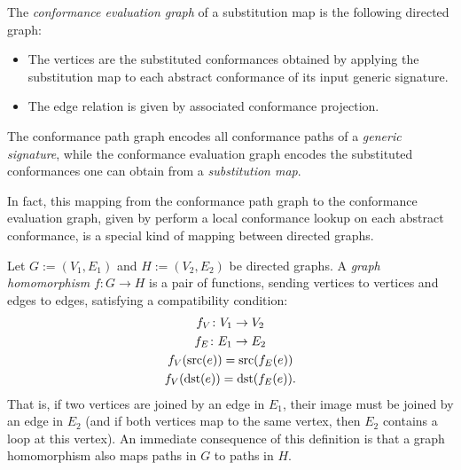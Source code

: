 \documentclass[../generics]{subfiles}
\begin{document}
\begin{definition}
The \emph{conformance evaluation graph} of a substitution map is the following directed graph:
\begin{itemize}
\item The vertices are the substituted conformances obtained by applying the substitution map to each abstract conformance of its input generic signature.
\item The edge relation is given by associated conformance projection.
\end{itemize}
The conformance path graph encodes all conformance paths of a \emph{generic signature}, while the conformance evaluation graph encodes the substituted conformances one can obtain from a \emph{substitution map}.
\end{definition}
In fact, this mapping from the conformance path graph to the conformance evaluation graph, given by perform a local conformance lookup on each abstract conformance, is a special kind of mapping between directed graphs.
\begin{definition}
Let $G:=(V_1,E_1)$ and $H:=(V_2,E_2)$ be directed graphs. A \emph{graph homomorphism} $f\colon G\rightarrow H$ is a pair of functions, sending vertices to vertices and edges to edges, satisfying a compatibility condition:
\begin{gather*}
f_V\colon V_1\rightarrow V_2\\
f_E\colon E_1\rightarrow E_2\\
f_V(\operatorname{src}(e)) = \operatorname{src}(f_E(e))\\
f_V(\operatorname{dst}(e)) = \operatorname{dst}(f_E(e)).
\end{gather*}
That is, if two vertices are joined by an edge in $E_1$, their image must be joined by an edge in $E_2$ (and if both vertices map to the same vertex, then $E_2$ contains a loop at this vertex). An immediate consequence of this definition is that a graph homomorphism also maps paths in $G$ to paths in $H$.
\end{definition}
\end{document}
